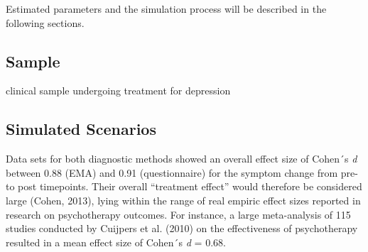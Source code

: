 \documentclass[12pt,twoside]{reedthesis}
\begin{document}
\par

Estimated parameters and the simulation process will be described in the following sections.

\hypertarget{sample}{%
\subsection{Sample}\label{sample}}

clinical sample undergoing treatment for depression

\hypertarget{simulated-scenarios}{%
\subsection{Simulated Scenarios}\label{simulated-scenarios}}

Data sets for both diagnostic methods showed an overall effect size of Cohen´s \emph{d} between 0.88 (EMA) and 0.91 (questionnaire) for the symptom change from pre- to post timepoints. Their overall \enquote{treatment effect} would therefore be considered large (Cohen, 2013), lying within the range of real empiric effect sizes reported in research on psychotherapy outcomes. For instance, a large meta-analysis of 115 studies conducted by Cuijpers et al. (2010) on the effectiveness of psychotherapy resulted in a mean effect size of Cohen´s \emph{d} = 0.68.
\end{document}
